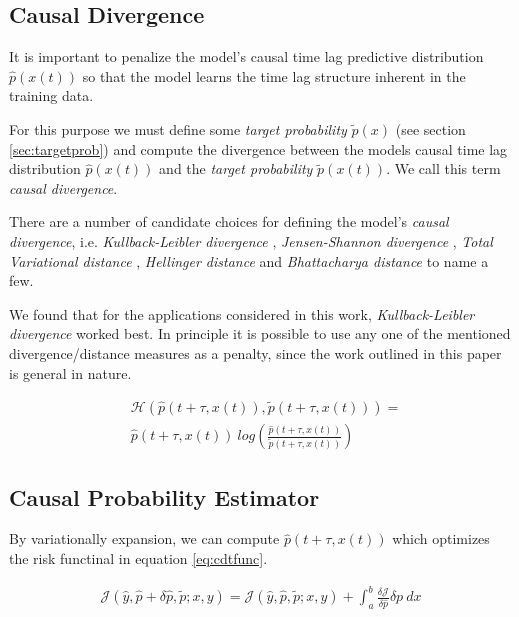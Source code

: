 \documentclass[envcountsect,runningheads]{llncs}
\theoremstyle{etoile}
\begin{document}
\subsection{Causal Divergence}

It is important to penalize the model's causal time lag predictive distribution 
$\hat{p}(x(t))$ so that the model learns the time lag structure inherent in the 
training data.

For this purpose we must define some \emph{target probability} $\tilde{p}(x)$ 
(see section \ref{sec:targetprob}) and compute the divergence between the models causal 
time lag distribution $\hat{p}(x(t))$ and the \emph{target probability} $\tilde{p}(x(t))$. 
We call this term \emph{causal divergence}.

There are a number of candidate choices for defining the model's \emph{causal divergence}, 
i.e.  \emph{Kullback-Leibler divergence} \cite{kullback1951}, 
\emph{Jensen-Shannon divergence} \cite{jensen-shannon}, \emph{Total Variational distance} 
\cite{villani2009three}, \emph{Hellinger distance} \cite{hellinger} and 
\emph{Bhattacharya distance} \cite{bhattacharyya} to name a few. 

We found that for the applications considered in this work, \emph{Kullback-Leibler divergence} 
worked best. In principle it is possible to use any one of the mentioned 
divergence/distance measures as a penalty, since the work outlined in this 
paper is general in nature.

\begin{align}\label{eq:causaldiv}
&\mathcal{H}\left(\hat{p}(t + \tau, x(t)), \tilde{p}(t + \tau, x(t))\right) = \\
&\nonumber \hat{p}(t + \tau, x(t)) \ log \left( \frac{\hat{p}(t + \tau, x(t))}{\tilde{p}(t + \tau, x(t))}\right)
\end{align}

\subsection{Causal Probability Estimator}

By variationally expansion, we can compute $\hat{p}(t + \tau, x(t))$ which optimizes the risk functinal in 
equation \ref{eq:cdtfunc}.

\begin{align}
      \mathcal{J}(\hat{y}, \hat{p} + \delta \hat{p}, \tilde{p}; x, y) = 
      \mathcal{J}(\hat{y}, \hat{p}, \tilde{p}; x, y) + 
      \int_a^b \frac{\delta \mathcal{J}}{\delta \hat{p}} {\delta p} \ dx
\end{align}
\end{document}
